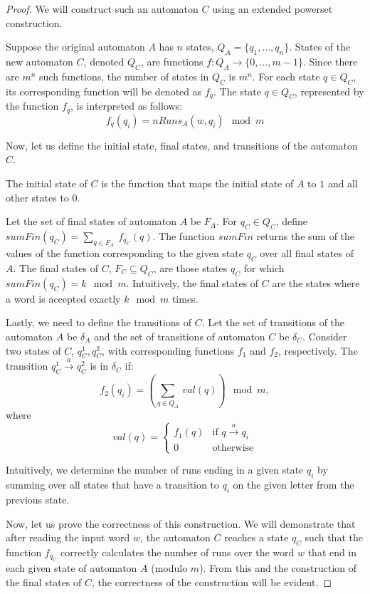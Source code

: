 \documentclass[12pt]{article}
\theoremstyle{definition}
\begin{document}
\begin{proof}
    We will construct such an automaton $C$ using an extended powerset construction.

    Suppose the original automaton $A$ has $n$ states, $Q_A = \{q_1, \ldots, q_n\}$. States of the new automaton $C$, denoted $Q_C$, are functions $f: Q_A \rightarrow \{0, \ldots, m-1 \}$. Since there are $m^n$ such functions, the number of states in $Q_C$ is $m^n$. For each state $q \in Q_C$, its corresponding function will be denoted as $f_q$. The state $q \in Q_C$, represented by the function $f_q$, is interpreted as follows:
    $$f_q(q_i) = nRuns_A(w, q_i) \mod m$$

    Now, let us define the initial state, final states, and transitions of the automaton $C$.

    The initial state of $C$ is the function that maps the initial state of $A$ to $1$ and all other states to $0$.

    Let the set of final states of automaton $A$ be $F_A$. For $q_C \in Q_C$, define $sumFin(q_C) = \sum_{q \in F_A} \ f_{q_C}(q)$. The function $sumFin$ returns the sum of the values of the function corresponding to the given state $q_C$ over all final states of $A$. The final states of $C$, $F_C \subseteq Q_C$, are those states $q_C$ for which $sumFin(q_C) = k \mod m$. Intuitively, the final states of $C$ are the states where a word is accepted exactly $k \mod m$ times.

    Lastly, we need to define the transitions of $C$. Let the set of transitions of the automaton $A$ be $\delta_A$ and the set of transitions of automaton $C$ be $\delta_C$. Consider two states of $C$, $q_C^1, q_C^2$, with corresponding functions $f_1$ and $f_2$, respectively. The transition $q_C^1 \xrightarrow{a} q_C^2$ is in $\delta_C$ if:
    $$f_2(q_i) = (\sum_{q \in Q_A} \ val(q)) \mod m,$$
    where
    \begin{equation*}
        val(q) =
            \begin{cases}
            f_1(q) & \text{if $q \xrightarrow{a} q_i$} \\
            0 & \text{otherwise}
            \end{cases}       
    \end{equation*}

    Intuitively, we determine the number of runs ending in a given state $q_i$ by summing over all states that have a transition to $q_i$ on the given letter from the previous state.

    Now, let us prove the correctness of this construction. We will demonstrate that after reading the input word $w$, the automaton $C$ reaches a state $q_C$ such that the function $f_{q_C}$ correctly calculates the number of runs over the word $w$ that end in each given state of automaton $A$ (modulo $m$). From this and the construction of the final states of $C$, the correctness of the construction will be evident.


\end{proof}
\end{document}
